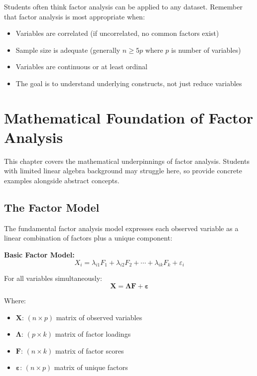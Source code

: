 \documentclass[a4paper]{tufte-book}
\begin{document}
\begin{commonmistake}
Students often think factor analysis can be applied to any dataset. Remember that factor analysis is most appropriate when:
\begin{itemize}
\item Variables are correlated (if uncorrelated, no common factors exist)
\item Sample size is adequate (generally $n \geq 5p$ where $p$ is number of variables)
\item Variables are continuous or at least ordinal
\item The goal is to understand underlying constructs, not just reduce variables
\end{itemize}
\end{commonmistake}


\chapter{Mathematical Foundation of Factor Analysis}

\begin{pedagogicalnote}
This chapter covers the mathematical underpinnings of factor analysis. Students with limited linear algebra background may struggle here, so provide concrete examples alongside abstract concepts.
\end{pedagogicalnote}

\section{The Factor Model}

The fundamental factor analysis model expresses each observed variable as a linear combination of factors plus a unique component:

\begin{mathconcept}
\textbf{Basic Factor Model:}
$$X_i = \lambda_{i1}F_1 + \lambda_{i2}F_2 + \cdots + \lambda_{ik}F_k + \varepsilon_i$$

For all variables simultaneously:
$$\mathbf{X} = \boldsymbol{\Lambda}\mathbf{F} + \boldsymbol{\varepsilon}$$

Where:
\begin{itemize}
\item $\mathbf{X}$: $(n \times p)$ matrix of observed variables
\item $\boldsymbol{\Lambda}$: $(p \times k)$ matrix of factor loadings
\item $\mathbf{F}$: $(n \times k)$ matrix of factor scores
\item $\boldsymbol{\varepsilon}$: $(n \times p)$ matrix of unique factors
\end{itemize}
\end{mathconcept}
\end{document}
